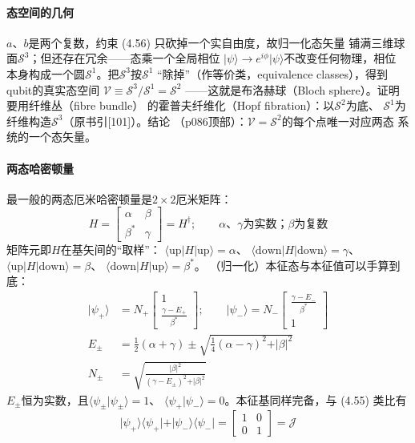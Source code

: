 \paragraph{态空间的几何}
$a$、$b$是两个复数，约束 (4.56) 只砍掉一个实自由度，故归一化态矢量
铺满三维球面$\mathcal{S}^{3}$；但还存在冗余——态乘一个全局相位
$\vert\psi\rangle\to e^{i\phi}\vert\psi\rangle$不改变任何物理，相位
本身构成一个圆$\mathcal{S}^{1}$。把$\mathcal{S}^{3}$按$\mathcal{S}^{1}$
“除掉”（作等价类，equivalence classes），得到qubit的真实态空间
$\mathcal{V}\equiv\mathcal{S}^{3}/\mathcal{S}^{1}=\mathcal{S}^{2}$
——这就是布洛赫球（Bloch sphere）。证明要用纤维丛（fibre bundle）
的霍普夫纤维化（Hopf fibration）：以$\mathcal{S}^{2}$为底、
$\mathcal{S}^{1}$为纤维构造$\mathcal{S}^{3}$（原书引[101]）。结论
（p086顶部）：$\mathcal{V}=\mathcal{S}^{2}$的每个点唯一对应两态
系统的一个态矢量。

\paragraph{两态哈密顿量}
最一般的两态厄米哈密顿量是$2\times2$厄米矩阵：
\begin{equation*}
H=\begin{bmatrix}\alpha & \beta\\ \beta^{*} & \gamma\end{bmatrix}
=H^{\dagger};\qquad \text{$\alpha$、$\gamma$为实数；$\beta$为复数}
\tag{4.57}
\end{equation*}
矩阵元即$H$在基矢间的“取样”：
$\langle\mathrm{up}\vert H\vert\mathrm{up}\rangle=\alpha$、
$\langle\mathrm{down}\vert H\vert\mathrm{down}\rangle=\gamma$、
$\langle\mathrm{up}\vert H\vert\mathrm{down}\rangle=\beta$、
$\langle\mathrm{down}\vert H\vert\mathrm{up}\rangle=\beta^{*}$。
（归一化）本征态与本征值可以手算到底：
\begin{align*}
\vert\psi_{+}\rangle&=N_{+}\begin{bmatrix}1\\[2pt]\frac{\gamma-E_{+}}{\beta^{*}}\end{bmatrix};
\qquad
\vert\psi_{-}\rangle=N_{-}\begin{bmatrix}\frac{\gamma-E_{-}}{\beta^{*}}\\[2pt]1\end{bmatrix}\\
E_{\pm}&=\frac{1}{2}(\alpha+\gamma)\pm\sqrt{\frac{1}{4}(\alpha-\gamma)^{2}+\vert\beta\vert^{2}}\\
N_{\pm}&=\sqrt{\frac{\vert\beta\vert^{2}}{(\gamma-E_{\pm})^{2}+\vert\beta\vert^{2}}}
\end{align*}
$E_{\pm}$恒为实数，且$\langle\psi_{\pm}\vert\psi_{\pm}\rangle=1$、
$\langle\psi_{+}\vert\psi_{-}\rangle=0$。本征基同样完备，与
(4.55) 类比有
\begin{equation*}
\vert\psi_{+}\rangle\langle\psi_{+}\vert+\vert\psi_{-}\rangle
\langle\psi_{-}\vert=\begin{bmatrix}1&0\\0&1\end{bmatrix}=\mathcal{J}
\tag{4.58}
\end{equation*}

